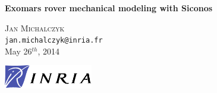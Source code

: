 \begin{titlepage}
\begin{center}

{\huge \bfseries Exomars rover mechanical modeling with Siconos}

\vspace{2cm} 

\textsc{Jan Michalczyk} \\

\texttt{jan.michalczyk@inria.fr} \\[2cm] 

{May 26$^{th}$, 2014}

\vspace{2cm} 

\includegraphics[width=0.29\textwidth]{INRIA}

\end{center}
\end{titlepage}
